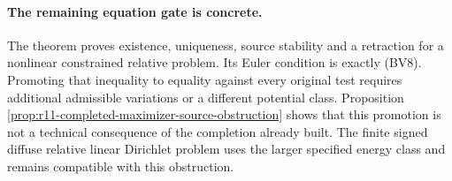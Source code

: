 \paragraph{The remaining equation gate is concrete.}
The theorem proves existence, uniqueness, source
stability and a retraction for a nonlinear
constrained relative problem.
Its Euler condition is exactly (BV8).
Promoting that inequality to equality against
every original test requires additional
admissible variations or a different potential
class.  Proposition
\ref{prop:r11-completed-maximizer-source-obstruction}
shows that this promotion is not a technical
consequence of the completion already built.
The finite signed diffuse relative linear
Dirichlet problem uses the larger specified
energy class and remains compatible with
this obstruction.

